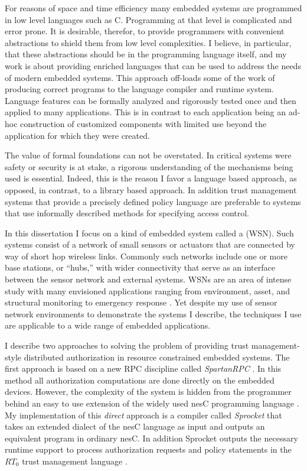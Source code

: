 For reasons of space and time efficiency many embedded systems are programmed in low level
languages such as C. Programming at that level is complicated and error prone. It is desirable,
therefor, to provide programmers with convenient abstractions to shield them from low level
complexities. I believe, in particular, that these abstractions should be in the programming
language itself, and my work is about providing enriched languages that can be used to address
the needs of modern embedded systems. This  approach off-loads some of
the work of producing correct programs to the language compiler and runtime system. Language
features can be formally analyzed and rigorously tested once and then applied to many
applications. This is in contrast to each application being an ad-hoc construction of customized
components with limited use beyond the application for which they were created.

The value of formal foundations can not be overstated. In critical systems were safety or
security is at stake, a rigorous understanding of the mechanisms being used is essential.
Indeed, this is the reason I favor a language based approach, as opposed, in contrast, to a
library based approach. In addition trust management systems that provide a precisely defined
policy language are preferable to systems that use informally described methods for specifying
access control.

In this dissertation I focus on a kind of embedded system called a  (WSN). Such systems consist of a network of small sensors or actuators that are
connected by way of short hop wireless links. Commonly such networks include one or more base
stations, or ``hubs,'' with wider connectivity that serve as an interface between the sensor
network and external systems. WSNs are an area of intense study with many envisioned
applications ranging from environment, asset, and structural monitoring to emergency response
\cite{Culler:2004:GEI:1018015.1018072,1038146}. Yet despite my use of sensor network
environments to demonstrate the systems I describe, the techniques I use are applicable to a
wide range of embedded applications.

I describe two approaches to solving the problem of providing trust management-style distributed
authorization in resource constrained embedded systems. The first approach is based on a new RPC
discipline called \textit{SpartanRPC}
\cite{chapin-skalka-SpartanRPC,chapin-skalka-SpartanRPCTR}. In this method all authorization
computations are done directly on the embedded devices. However, the complexity of the system is
hidden from the programmer behind an easy to use extension of the widely used nesC programming
language \cite{Gay-nesC-2003}. My implementation of this \emph{direct} approach is a compiler
called \textit{Sprocket} that takes an extended dialect of the nesC language as input and
outputs an equivalent program in ordinary nesC. In addition Sprocket outputs the necessary
runtime support to process authorization requests and policy statements in the $RT_0$ trust
management language \cite{Li:DRBTMF,Li:RRBTMF}.


